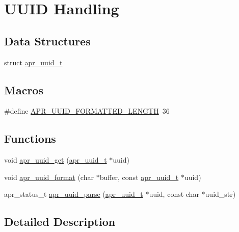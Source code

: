 \hypertarget{group___a_p_r___u_u_i_d}{\section{U\-U\-I\-D Handling}
\label{group___a_p_r___u_u_i_d}
}
\subsection*{Data Structures}
\begin{DoxyCompactItemize}
\item 
struct \hyperlink{structapr__uuid__t}{apr\-\_\-uuid\-\_\-t}
\end{DoxyCompactItemize}
\subsection*{Macros}
\begin{DoxyCompactItemize}
\item 
\#define \hyperlink{group___a_p_r___u_u_i_d_ga295b64f854c9dff02bb0c44e4be917a3}{A\-P\-R\-\_\-\-U\-U\-I\-D\-\_\-\-F\-O\-R\-M\-A\-T\-T\-E\-D\-\_\-\-L\-E\-N\-G\-T\-H}~36
\end{DoxyCompactItemize}
\subsection*{Functions}
\begin{DoxyCompactItemize}
\item 
void \hyperlink{group___a_p_r___u_u_i_d_ga129830a7a3c6b77047d2e74e261a7364}{apr\-\_\-uuid\-\_\-get} (\hyperlink{structapr__uuid__t}{apr\-\_\-uuid\-\_\-t} $\ast$uuid)
\item 
void \hyperlink{group___a_p_r___u_u_i_d_ga539a9fee8522a416634194b648ca9790}{apr\-\_\-uuid\-\_\-format} (char $\ast$buffer, const \hyperlink{structapr__uuid__t}{apr\-\_\-uuid\-\_\-t} $\ast$uuid)
\item 
apr\-\_\-status\-\_\-t \hyperlink{group___a_p_r___u_u_i_d_ga66d90e0c926ef51a8d607d164e2d7ae7}{apr\-\_\-uuid\-\_\-parse} (\hyperlink{structapr__uuid__t}{apr\-\_\-uuid\-\_\-t} $\ast$uuid, const char $\ast$uuid\-\_\-str)
\end{DoxyCompactItemize}


\subsection{Detailed Description}


